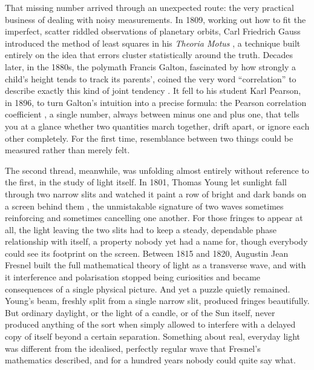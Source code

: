 	That missing number arrived through an unexpected route: the very practical business
	of dealing with noisy measurements. In 1809, working out how to fit the imperfect,
	scatter riddled observations of planetary orbits, Carl Friedrich Gauss introduced the
	method of least squares in his \textit{Theoria Motus} \cite{gauss1809theoria}, a
	technique built entirely on the idea that errors cluster statistically around the truth.
	Decades later, in the 1880s, the polymath Francis Galton, fascinated by how strongly a
	child's height tends to track its parents', coined the very word ``correlation'' to
	describe exactly this kind of joint tendency \cite{galton1888correlations}. It fell to
	his student Karl Pearson, in 1896, to turn Galton's intuition into a precise formula: the
	Pearson correlation coefficient \cite{pearson1896regression}, a single number, always
	between minus one and plus one, that tells you at a glance whether two quantities march
	together, drift apart, or ignore each other completely. For the first time, resemblance
	between two things could be measured rather than merely felt.

	The second thread, meanwhile, was unfolding almost entirely without reference to the
	first, in the study of light itself. In 1801, Thomas Young let sunlight fall through two
	narrow slits and watched it paint a row of bright and dark bands on a screen behind
	them \cite{young1804bakerian}, the unmistakable signature of two waves sometimes
	reinforcing and sometimes cancelling one another. For those fringes to appear at all, the
	light leaving the two slits had to keep a steady, dependable phase relationship with
	itself, a property nobody yet had a name for, though everybody could see its footprint on
	the screen. Between 1815 and 1820, Augustin Jean Fresnel built the full mathematical
	theory of light as a transverse wave, and with it interference and polarisation stopped
	being curiosities and became consequences of a single physical picture. And yet a puzzle
	quietly remained. Young's beam, freshly split from a single narrow slit, produced fringes
	beautifully. But ordinary daylight, or the light of a candle, or of the Sun itself, never
	produced anything of the sort when simply allowed to interfere with a delayed copy of
	itself beyond a certain separation. Something about real, everyday light was different
	from the idealised, perfectly regular wave that Fresnel's mathematics described, and for
	a hundred years nobody could quite say what.

